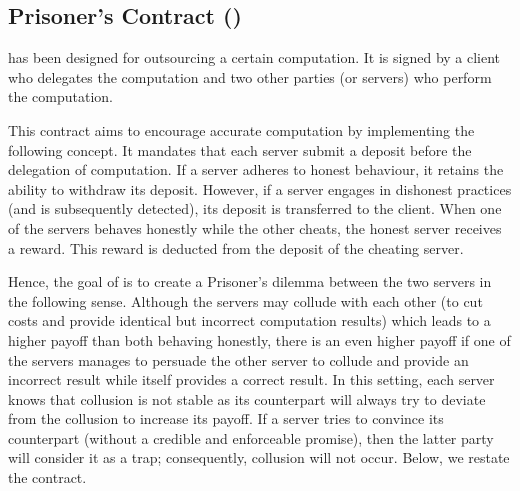 

\subsection{Prisoner's Contract (\SCpc)}

\SCpc has been designed for outsourcing a certain computation. It is signed by a client who delegates the computation and two other parties  (or servers)  who perform the computation.  

This contract aims to encourage accurate computation by implementing the following concept. It mandates that each server submit a deposit before the delegation of computation. If a server adheres to honest behaviour, it retains the ability to withdraw its deposit. However, if a server engages in dishonest practices (and is subsequently detected), its deposit is transferred to the client. When one of the servers behaves honestly while the other cheats, the honest server receives a reward. This reward is deducted from the deposit of the cheating server.

Hence, the goal of \SCpc is to create a Prisoner’s dilemma between the two servers in the following sense. Although the servers may collude with each other (to cut costs and provide identical but incorrect computation results) which leads to a higher payoff than both behaving honestly,  there is an even higher payoff if one of the servers manages to persuade the other server to collude and provide an incorrect result while itself provides a correct result. In this setting, each server knows that collusion is not stable as its counterpart will always try to deviate from the collusion to increase its payoff.  If a server tries to convince its counterpart (without a credible and enforceable promise), then the latter party will consider it as a trap; consequently, collusion will not occur. Below, we restate the contract. %

